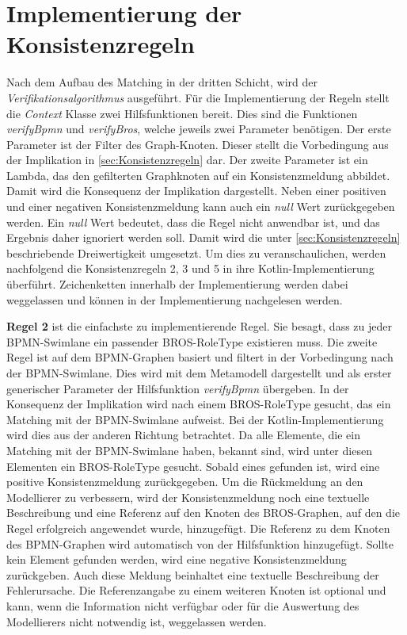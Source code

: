 \pagebreak
\section{Implementierung der Konsistenzregeln}
\label{sec:implementaion_consistency_rules}

Nach dem Aufbau des Matching in der dritten Schicht, wird der \emph{Verifikationsalgorithmus} ausgeführt.
Für die Implementierung der Regeln stellt die \emph{Context} Klasse zwei Hilfsfunktionen bereit.
Dies sind die Funktionen \emph{verifyBpmn} und \emph{verifyBros}, welche jeweils zwei Parameter benötigen.
Der erste Parameter ist der Filter des Graph-Knoten.
Dieser stellt die Vorbedingung aus der Implikation in \cref{sec:Konsistenzregeln} dar.
Der zweite Parameter ist ein Lambda, das den gefilterten Graphknoten auf ein Konsistenzmeldung abbildet.
Damit wird die Konsequenz der Implikation dargestellt.
Neben einer positiven und einer negativen Konsistenzmeldung kann auch ein \emph{null} Wert zurückgegeben werden.
Ein \emph{null} Wert bedeutet, dass die Regel nicht anwendbar ist, und das Ergebnis daher ignoriert werden soll.
Damit wird die unter \cref{sec:Konsistenzregeln} beschriebende Dreiwertigkeit umgesetzt.
Um dies zu veranschaulichen, werden nachfolgend die Konsistenzregeln 2, 3 und 5 in ihre Kotlin-Implementierung überführt.
Zeichenketten innerhalb der Implementierung werden dabei weggelassen und können in der Implementierung nachgelesen werden.

\textbf{Regel 2} ist die einfachste zu implementierende Regel.
Sie besagt, dass zu jeder BPMN-Swimlane ein passender BROS-RoleType existieren muss.
Die zweite Regel ist auf dem BPMN-Graphen basiert und filtert in der Vorbedingung nach der BPMN-Swimlane.
Dies wird mit dem Metamodell dargestellt und als erster generischer Parameter der Hilfsfunktion \emph{verifyBpmn} übergeben.
In der Konsequenz der Implikation wird nach einem BROS-RoleType gesucht, das ein Matching mit der BPMN-Swimlane aufweist.
Bei der Kotlin-Implementierung wird dies aus der anderen Richtung betrachtet.
Da alle Elemente, die ein Matching mit der BPMN-Swimlane haben, bekannt sind, wird unter diesen Elementen ein BROS-RoleType gesucht.
Sobald eines gefunden ist, wird eine positive Konsistenzmeldung zurückgegeben.
Um die Rückmeldung an den Modellierer zu verbessern, wird der Konsistenzmeldung noch eine textuelle Beschreibung und eine Referenz auf den Knoten des BROS-Graphen, auf den die Regel erfolgreich angewendet wurde, hinzugefügt.
Die Referenz zu dem Knoten des BPMN-Graphen wird automatisch von der Hilfsfunktion hinzugefügt.
Sollte kein Element gefunden werden, wird eine negative Konsistenzmeldung zurückgeben.
Auch diese Meldung beinhaltet eine textuelle Beschreibung der Fehlerursache.
Die Referenzangabe zu einem weiteren Knoten ist optional und kann, wenn die Information nicht verfügbar oder für die Auswertung des Modellierers nicht notwendig ist, weggelassen werden.

